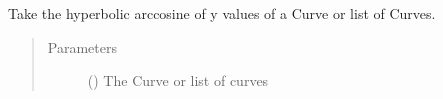 \documentclass[letterpaper,10pt,english]{sphinxmanual}
\begin{document}
\begin{fulllineitems}
\label{\detokenize{pydv:pydvpy.acosh}}
Take the hyperbolic arccosine of y values of a Curve or list of Curves.

\begin{sphinxVerbatim}[commandchars=\\\{\}]
  
\end{sphinxVerbatim}

\begin{sphinxVerbatim}[commandchars=\\\{\}]
 
\end{sphinxVerbatim}

\begin{sphinxVerbatim}[commandchars=\\\{\}]
\PYG{p}{[}\PYG{p}{]}
\end{sphinxVerbatim}
\begin{quote}\begin{description}
\item[{Parameters}] \leavevmode
{} ({\hyperref[\detokenize{pydv:curve.Curve}]{}}) \textendash{} The Curve or list of curves

\end{description}\end{quote}

\end{fulllineitems}

\end{document}
